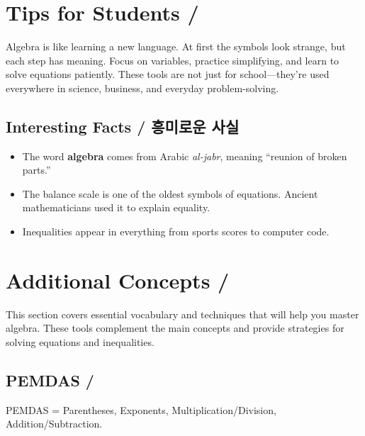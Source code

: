 \newpage
\section{Tips for Students / }
Algebra is like learning a new language. At first the symbols look strange, but each step has meaning. Focus on variables, practice simplifying, and learn to solve equations patiently. These tools are not just for school—they’re used everywhere in science, business, and everyday problem-solving.

\subsection{Interesting Facts / 흥미로운 사실}
\begin{itemize}
  \item The word \textbf{algebra} comes from Arabic \textit{al-jabr}, meaning ``reunion of broken parts.''  
  \item The balance scale is one of the oldest symbols of equations. Ancient mathematicians used it to explain equality.  
  \item Inequalities appear in everything from sports scores to computer code.  
\end{itemize}

\cleardoublepage

\section{Additional Concepts / }
This section covers essential vocabulary and techniques that will help you master algebra. These tools complement the main concepts and provide strategies for solving equations and inequalities.

\subsection{PEMDAS / }
PEMDAS = Parentheses, Exponents, Multiplication/Division, Addition/Subtraction.  
\blockquote{}

